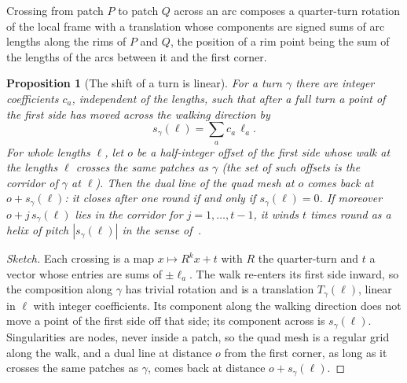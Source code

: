 \documentclass[11pt,a4paper]{article}
\newtheorem{proposition}{Proposition}
\newcommand{\shift}{s}
\newcommand{\lean}[1]{\texttt{\detokenize{#1}}}
\newenvironment{evidence}[3][]{}{}
\begin{document}
Crossing from patch $P$ to patch $Q$ across an arc composes a quarter-turn
rotation of the local frame with a translation whose components are signed
sums of arc lengths along the rims of $P$ and $Q$, the position of a rim
point being the sum of the lengths of the arcs between it and the first
corner.

\begin{evidence}{core}{\lean{TMesh.Turn.shift_linear}, \lean{TMesh.Turn.mem_corridor_iff}, \lean{TMesh.Turn.comes_back}, \lean{TMesh.Turn.winds}; examples: \lean{TMesh.twistedTorus.walk_turn}; assumed: an oriented gluing; the corridor without half-integers is not formalized}
\begin{proposition}[The shift of a turn is linear]\label{prop:linear}
For a turn $\gamma$ there are integer coefficients $c_a$, independent of the
lengths, such that after a full turn a point of the first side has moved
across the walking direction by
\[
  \shift_\gamma(\ell) = \sum_a c_a\, \ell_a .
\]
For whole lengths $\ell$, let $o$ be a half-integer offset of the first side
whose walk at the lengths $\ell$ crosses the same patches as $\gamma$ (the
set of such offsets is the \emph{corridor} of $\gamma$ at $\ell$). Then the
dual line of the quad mesh at $o$ comes back at $o + \shift_\gamma(\ell)$:
it closes after one round if and only if $\shift_\gamma(\ell) = 0$. If
moreover $o + j\,\shift_\gamma(\ell)$ lies in the corridor for $j = 1, \dots,
t - 1$, it winds $t$ times round as a helix of pitch $|\shift_\gamma(\ell)|$
in the sense of~\cite{bommes2011structure}.
\end{proposition}
\end{evidence}

\begin{proof}[Sketch]
Each crossing is a map $x \mapsto R^k x + t$ with $R$ the quarter-turn and
$t$ a vector whose entries are sums of $\pm\ell_a$. The walk re-enters its
first side inward, so the composition along $\gamma$ has trivial rotation and
is a translation $T_\gamma(\ell)$, linear in $\ell$ with integer
coefficients. Its component along the walking direction does not move a
point of the first side off that side; its component across is
$\shift_\gamma(\ell)$. Singularities are nodes, never inside a patch, so the
quad mesh is a regular grid along the walk, and a dual line at distance $o$
from the first corner, as long as it crosses the same patches as $\gamma$,
comes back at distance $o + \shift_\gamma(\ell)$.
\end{proof}
\end{document}

